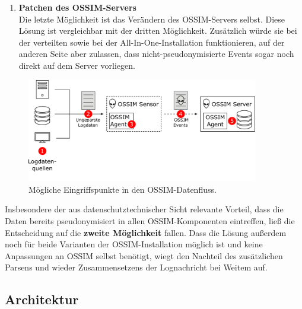 \begin{enumerate}
\item \textbf{Patchen des OSSIM-Servers}\\
  Die letzte Möglichkeit ist das Verändern des OSSIM-Servers selbst. Diese Lösung ist vergleichbar mit der dritten Möglichkeit. Zusätzlich würde sie bei der verteilten sowie bei der All-In-One-Installation funktionieren, auf der anderen Seite aber zulassen, dass nicht-pseudonymisierte Events sogar noch direkt auf dem Server vorliegen.

\end{enumerate}

\begin{figure}[]
    \centering
        \includegraphics[width=0.9\textwidth]{dia/ossim_data_access_point.pdf}
    \caption{Mögliche Eingriffspunkte in den OSSIM-Datenfluss.}
    \label{fig:ossim_data_access_point}
\end{figure}

Insbesondere der aus datenschutztechnischer Sicht relevante Vorteil, dass die Daten bereits pseudonymisiert in allen OSSIM-Komponenten eintreffen, ließ die Entscheidung auf die \textbf{zweite Möglichkeit} fallen. Dass die Lösung außerdem noch für beide Varianten der OSSIM-Installation möglich ist und keine Anpassungen an OSSIM selbst benötigt, wiegt den Nachteil des zusätzlichen Parsens und wieder Zusammensetzens der Lognachricht bei Weitem auf.





\subsection{Architektur}

%

